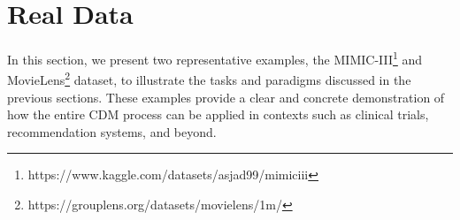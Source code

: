 \section{Real Data}\label{sec:real_data}

In this section, we present two representative examples, the \acrfull{MIMIC-III}\footnote{https://www.kaggle.com/datasets/asjad99/mimiciii} and MovieLens\footnote{https://grouplens.org/datasets/movielens/1m/} dataset, to illustrate the tasks and paradigms discussed in the previous sections. These examples provide a clear and concrete demonstration of how the entire \acrshort{CDM} process can be applied in contexts such as clinical trials, recommendation systems, and beyond. %






